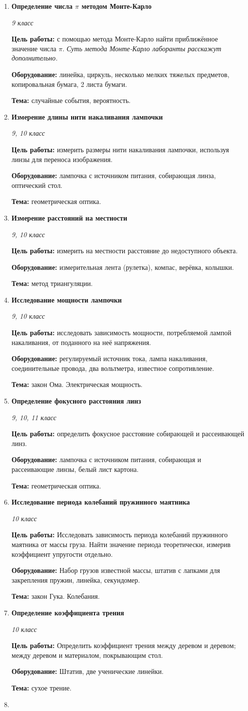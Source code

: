 \documentclass[a4paper,10pt]{article}
\newcommand{\labtitle}[5]{
	\textbf{#2}\par
	\textit{#1 класс}\par
	\textbf{Цель работы:} #3\par
	\textbf{Оборудование:} #4\par
	\textbf{Тема:} #5
}
\begin{document}
\begin{enumerate}
	\item \labtitle
		{9}
		{Определение числа $\pi$ методом Монте-Карло}
		{с помощью метода Монте-Карло найти приближённое значение числа $\pi$. \textit{Суть метода Монте-Карло лаборанты расскажут дополнительно.}}
		{линейка, циркуль, несколько мелких тяжелых предметов, копировальная бумага, 2 листа бумаги.}
		{случайные события, вероятность.}
	\item \labtitle
		{9, 10}
		{Измерение длины нити накаливания лампочки}
		{измерить размеры нити накаливания лампочки, используя линзы для переноса изображения.}
		{лампочка с источником питания, собирающая линза, оптический стол.}
		{геометрическая оптика.}
	\item \labtitle
		{9, 10}
		{Измерение расстояний на местности}
		{измерить на местности расстояние до недоступного объекта.}
		{измерительная лента (рулетка), компас, верёвка, колышки.}
		{метод триангуляции.}
	\item \labtitle
		{9, 10}
		{Исследование мощности лампочки}
		{исследовать зависимость мощности, потребляемой лампой накаливания, от поданного на неё напряжения.}
		{регулируемый источник тока, лампа накаливания, соединительные провода, два вольтметра, известное сопротивление.}
		{закон Ома. Электрическая мощность.}
	\item \labtitle
		{9, 10, 11}
		{Определение фокусного расстояния линз}
		{определить фокусное расстояние собирающей и рассеивающей линз.}
		{лампочка с источником питания, собирающая и рассеивающие линзы, белый лист картона.}
		{геометрическая оптика.}
	\item \labtitle
		{10}
		{Исследование периода колебаний пружинного маятника}
		{Исследовать зависимость периода колебаний пружинного маятника от массы груза. Найти значение периода теоретически, измерив коэффициент упругости отдельно.}
		{Набор грузов известной массы, штатив с лапками для закрепления пружин, линейка, секундомер.}
		{закон Гука. Колебания.}
	\item \labtitle
		{10}
		{Определение коэффициента трения}
		{Определить коэффициент трения между деревом и деревом; между деревом и материалом, покрывающим стол.}
		{Штатив, две ученические линейки.}
		{сухое трение.}
	\item \labtitle

\end{enumerate}
\end{document}
